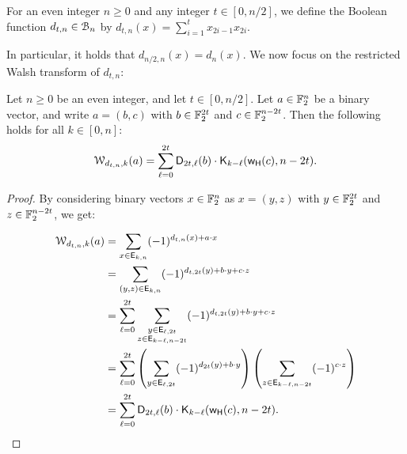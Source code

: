 \documentclass[11pt]{llncs}
\begin{document}
\begin{definition}
	For an even integer $n\geq 0$ and any integer $t\in[0,n/2]$, we define the Boolean function $d_{t,n}\in\mathcal{B}_n$ by $d_{t,n}(x)=\sum_{i=1}^t x_{2i-1} x_{2i}$.
\end{definition}

In particular, it holds that $d_{n/2,n}(x)=d_n(x)$. 
We now focus on the restricted Walsh transform of $d_{t,n}$:

\begin{proposition}\label{proposition:dtn}
    Let $n\geq 0$ be an even integer, and let $t\in[0,n/2]$. Let $a\in\mathbb{F}_2^n$ be a binary vector, and write $a=(b,c)$ with $b\in\mathbb{F}_2^{2t}$ and $c\in\mathbb{F}_2^{n-2t}$. Then the following holds for all $k\in [0,n]$:
	\[\mathcal{W}_{d_{t,n},k}(a)=\sum_{\ell=0}^{2t} \mathsf{D}_{2t,\ell}(b)\cdot\mathsf{K}_{k-\ell}(\mathsf{w_H}(c),n-2t).\]
\end{proposition}
\begin{proof}
    By considering binary vectors $x\in\mathbb{F}_2^n$ as $x=(y,z)$ with $y\in\mathbb{F}_2^{2t}$ and $z\in\mathbb{F}_2^{n-2t}$, we get:
	
	\begin{align*}
\mathcal{W}_{d_{t,n},k}(a)&=\sum_{x \in \mathsf{E}_{k,n}} (-1)^{d_{t,n}(x)+a \cdot x}\\&=\sum_{(y,z)\in\mathsf{E}_{k,n}} (-1)^{d_{t,2t}(y)+b \cdot y +c \cdot z}\\&=\sum_{\ell=0}^{2t} \sum_{\substack{y \in \mathsf{E}_{\ell,2t}\\z \in \mathsf{E}_{k-\ell,n-2t}}} (-1)^{d_{t,2t}(y)+b \cdot y +c \cdot z}\\
&=\sum_{\ell=0}^{2t}\left(\sum_{y \in \mathsf{E}_{\ell,2t}} (-1)^{d_{2t}(y)+b \cdot y}\right)\left( \sum_{z \in \mathsf{E}_{k-\ell,n-2t}} (-1)^{c \cdot z}\right)\\&=\sum_{\ell=0}^{2t} \mathsf{D}_{2t,\ell}(b)\cdot\mathsf{K}_{k-\ell}(\mathsf{w_H}(c),n-2t).\qedhere
\end{align*}	



\end{proof}
\end{document}
